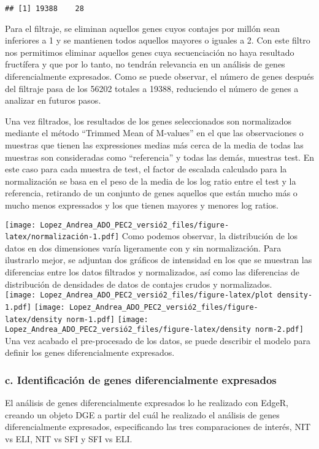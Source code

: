 \documentclass[
]{article}
\begin{document}
\begin{verbatim}
## [1] 19388    28
\end{verbatim}

Para el filtraje, se eliminan aquellos genes cuyos contajes por millón
sean inferiores a 1 y se mantienen todos aquellos mayores o iguales a 2.
Con este filtro nos permitimos eliminar aquellos genes cuya
secuenciación no haya resultado fructífera y que por lo tanto, no
tendrán relevancia en un análisis de genes diferencialmente expresados.
Como se puede observar, el número de genes después del filtraje pasa de
los 56202 totales a 19388, reduciendo el número de genes a analizar en
futuros pasos.

Una vez filtrados, los resultados de los genes seleccionados son
normalizados mediante el método ``Trimmed Mean of M-values'' en el que
las observaciones o muestras que tienen las expressiones medias más
cerca de la media de todas las muestras son consideradas como
``referencia'' y todas las demás, muestras test. En este caso para cada
muestra de test, el factor de escalada calculado para la normalización
se basa en el peso de la media de los log ratio entre el test y la
referencia, retirando de un conjunto de genes aquellos que están mucho
más o mucho menos expressados y los que tienen mayores y menores log
ratios.

\texttt{[image: Lopez\_Andrea\_ADO\_PEC2\_versió2\_files/figure-latex/normalización-1.pdf]}
Como podemos observar, la distribución de los datos en dos dimensiones
varía ligeramente con y sin normalización. Para ilustrarlo mejor, se
adjuntan dos gráficos de intensidad en los que se muestran las
diferencias entre los datos filtrados y normalizados, así como las
diferencias de distribución de densidades de datos de contajes crudos y
normalizados.\\
\texttt{[image: Lopez\_Andrea\_ADO\_PEC2\_versió2\_files/figure-latex/plot density-1.pdf]}
\texttt{[image: Lopez\_Andrea\_ADO\_PEC2\_versió2\_files/figure-latex/density norm-1.pdf]}
\texttt{[image: Lopez\_Andrea\_ADO\_PEC2\_versió2\_files/figure-latex/density norm-2.pdf]}
Una vez acabado el pre-procesado de los datos, se puede describir el
modelo para definir los genes diferencialmente expresados.

\subsubsection{c. Identificación de genes diferencialmente expresados}

El análisis de genes diferencialmente expresados lo he realizado con
EdgeR, creando un objeto DGE a partir del cuál he realizado el análisis
de genes diferencialmente expresados, especificando las tres
comparaciones de interés, NIT vs ELI, NIT vs SFI y SFI vs ELI.
\end{document}
